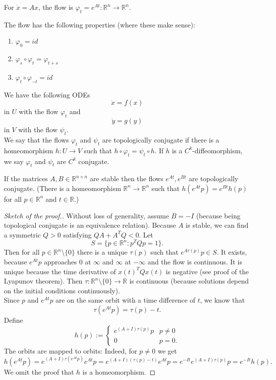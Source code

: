 \documentclass{article}
\newcommand*{\R}{\mathbb{R}}
\begin{document}
For $\dot x = Ax$, the flow is $\varphi_t = e^{At}:\R^n\to\R^n$.

\begin{prop}
    The flow has the following properties (where these make sense):
    \begin{enumerate}
        \item $\varphi_0=id$

        \item $\varphi_s\circ\varphi_t = \varphi_{t+s}$

        \item $\varphi_t\circ\varphi_{-t}=id$
    \end{enumerate}
\end{prop}

\begin{defin}
    We have the following ODEs
    $$\dot x=f(x)$$
    in $U$ with the flow $\varphi_t$ and
    $$\dot y=g(y)$$
    in $V$ with the flow $\psi_t$.\\
    We say that the flows $\varphi_t$ and $\psi_t$ are topologically conjugate if there is a homeomorphism $h:U\to V$ such that $h\circ \varphi_t=\psi_t\circ h$. If $h$ is a $C^k$-diffeomorphism, we say $\varphi_t$ and $\psi_t$ are $C^k$ conjugate.
\end{defin}

\begin{thm}
    If the matrices $A,B \in\R^{n\times n}$ are stable then the flows $e^{At}, e^{Bt}$ are topologically conjugate. (There is a homeomorphism $\R^n\to\R^n$ such that $h(e^{At}p)=e^{Bt}h(p)$ for all $p\in\R^n$ and $t\in\R$.)
\end{thm}

\begin{proof}[Sketch of the proof.]
    Without loss of generality, assume $B = -I$ (because being topological conjugate is an equivalence relation). Because $A$ is stable, we can find a symmetric $Q > 0$ satisfying $QA+A^TQ < 0$. Let
    $$S = \{p\in\R^n:p^TQp=1\}.$$
    Then for all $p \in \R^n\setminus \{0\}$ there is a unique $\tau(p)$ such that $e^{A\tau(p)}p\in S$. It exists, because $e^{At}p$ approaches $0$ at $\infty$ and $\infty$ at $-\infty$ and the flow is continuous. It is unique because the time derivative of $x(t)^TQx(t)$ is negative (see proof of the Lyapunov theorem). Then $\tau:\R^n \setminus\{0\} \to \R$ is continuous (because solutions depend on the initial conditions continuously).\\
    Since $p$ and $e^{At}p$ are on the same orbit with a time difference of $t$, we know that
    $$\tau(e^{At}p)=\tau(p)-t.$$
    Define
    $$h(p) := \begin{cases}
        e^{(A+I)\tau(p)}p&p \neq 0\\
        0&p=0.
    \end{cases}$$
    The orbits are mapped to orbits: Indeed, for $p\neq 0$ we get
    $$h(e^{At}p)=e^{(A+I)\tau(e^{At}p)}e^{At}p = e^{(A+I)(\tau(p)-t)}e^{At}p = e^{-It}e^{(A+I)\tau(p)}p  = e^{-It}h(p).$$
    We omit the proof that $h$ is a homeomorphism.
\end{proof}
\end{document}
